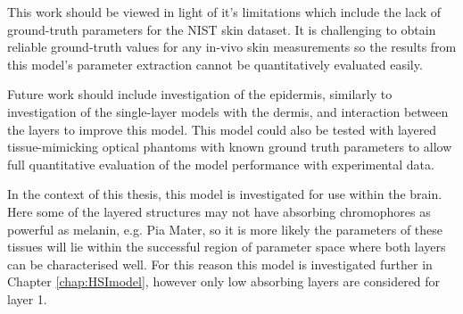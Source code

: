This work should be viewed in light of it's limitations which include the lack of ground-truth parameters for the NIST skin dataset. It is challenging to obtain reliable ground-truth values for any in-vivo skin measurements so the results from this model's parameter extraction cannot be quantitatively evaluated easily. 

Future work should include investigation of the epidermis, similarly to investigation of the single-layer models with the dermis, and interaction between the layers to improve this model. This model could also be tested with layered tissue-mimicking optical phantoms with known ground truth parameters to allow full quantitative evaluation of the model performance with experimental data. 

In the context of this thesis, this model is investigated for use within the brain. Here some of the layered structures may not have absorbing chromophores as powerful as melanin, e.g. Pia Mater, so it is more likely the parameters of these tissues will lie within the successful region of parameter space where both layers can be characterised well. For this reason this model is investigated further in Chapter \ref{chap:HSImodel}, however only low absorbing layers are considered for layer 1. 

% 
% 
% 